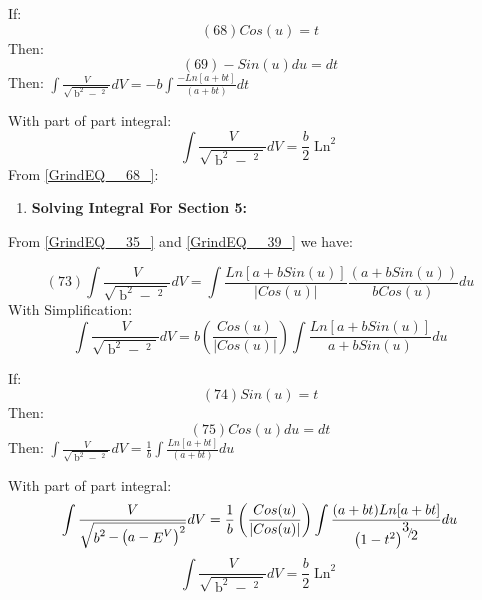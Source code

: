 \documentclass{article}
\begin{document}
\noindent If:
\[                    (68)                                   Cos(u)=t\] 
Then:
\[                     (69)                             -Sin(u)du=dt\] 
Then:                   $\int \frac{V}{\sqrt{\mathop{b}\nolimits^{2} -\mathop{\left(a-\mathop{E}\nolimits^{V} \right)}\nolimits^{2} } }  dV=-b\int \frac{-Ln[a+bt]}{(a+bt)}  dt$

\noindent With part of part integral:
\[\int \frac{V}{\sqrt{\mathop{b}\nolimits^{2} -\mathop{\left(a-\mathop{E}\nolimits^{V} \right)}\nolimits^{2} } }  dV=\frac{b}{2} \mathop{Ln[a+bCos(u)]}\nolimits^{2} \] 
From \eqref{GrindEQ__68_}:

\noindent 

\noindent 

\begin{enumerate}
\item  \textbf{Solving Integral For  Section 5:}
\end{enumerate}

\noindent From \eqref{GrindEQ__35_} and \eqref{GrindEQ__39_} we have:\textbf{}

\noindent \textbf{}
\[    (73)          \int \frac{V}{\sqrt{\mathop{b}\nolimits^{2} -\mathop{\left(a-\mathop{E}\nolimits^{V} \right)}\nolimits^{2} } }  dV=\int \frac{Ln[a+bSin(u)]}{\left|Cos(u)\right|}  \frac{\left(a+bSin(u)\right)}{bCos(u)} du\] 
With Simplification:
\[\int \frac{V}{\sqrt{\mathop{b}\nolimits^{2} -\mathop{\left(a-\mathop{E}\nolimits^{V} \right)}\nolimits^{2} } }  dV=b\left(\frac{Cos(u)}{\left|Cos(u)\right|} \right)\int \frac{Ln[a+bSin(u)]}{a+bSin(u)}  du\] 


\noindent If:
\[                    (74)                                   Sin(u)=t\] 
Then:
\[                     (75)                             Cos(u)du=dt\] 
Then:                   $\int \frac{V}{\sqrt{\mathop{b}\nolimits^{2} -\mathop{\left(a-\mathop{E}\nolimits^{V} \right)}\nolimits^{2} } }  dV=\frac{1}{b} \int \frac{Ln[a+bt]}{(a+bt)}  du$

\noindent With part of part integral:
\[\int \frac{V}{\sqrt{\mathop{b}\nolimits^{2} -\mathop{\left(a-\mathop{E}\nolimits^{V} \right)}\nolimits^{2} } }  dV=\frac{1}{b} \left(\frac{Cos(u)}{\left|Cos(u)\right|} \right)\int \frac{(a+bt)Ln[a+bt]}{\mathop{\left(\mathop{1-t}\nolimits^{2} \right)}\nolimits^{{\raise0.7ex\hbox{$ 3 $}\!\mathord{\left/{\vphantom{3 2}}\right.\kern-\nulldelimiterspace}\!\lower0.7ex\hbox{$ 2 $}} } }  du\] 
\[\int \frac{V}{\sqrt{\mathop{b}\nolimits^{2} -\mathop{\left(a-\mathop{E}\nolimits^{V} \right)}\nolimits^{2} } }  dV=\frac{b}{2} \mathop{Ln[a+bSin(u)]}\nolimits^{2} \] 
\end{document}
